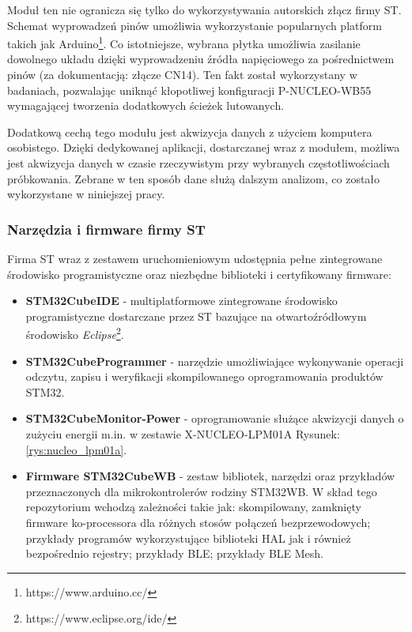 Moduł ten nie ogranicza się tylko do wykorzystywania autorskich złącz firmy ST. Schemat wyprowadzeń pinów
umożliwia wykorzystanie popularnych platform takich jak Arduino\footnote{https://www.arduino.cc/}. Co istotniejsze, wybrana płytka umożliwia
zasilanie dowolnego układu dzięki wyprowadzeniu źródła napięciowego za pośrednictwem pinów 
(za dokumentacją: złącze CN14). Ten fakt został wykorzystany w badaniach, pozwalając uniknąć kłopotliwej
konfiguracji P-NUCLEO-WB55 wymagającej tworzenia dodatkowych ścieżek lutowanych.

Dodatkową cechą tego modułu jest akwizycja danych z użyciem komputera osobistego. Dzięki dedykowanej
aplikacji, dostarczanej wraz z modułem, możliwa jest akwizycja danych w czasie rzeczywistym przy
wybranych częstotliwościach próbkowania. Zebrane w ten sposób dane służą dalszym analizom, co zostało
wykorzystane w niniejszej pracy. 

\subsubsection{Narzędzia i firmware firmy ST}
Firma ST wraz z zestawem uruchomieniowym udostępnia pełne zintegrowane środowisko
programistyczne oraz niezbędne biblioteki i certyfikowany firmware:

\begin{itemize}
\item \textbf{STM32CubeIDE} \cite{noauthor_stm32cubeide_2022} - multiplatformowe zintegrowane środowisko programistyczne
dostarczane przez ST bazujące na otwartoźródłowym środowisko \textit{Eclipse}\footnote{https://www.eclipse.org/ide/}.
\item \textbf{STM32CubeProgrammer} \cite{noauthor_stm32cubeprog_2022} - narzędzie umożliwiające wykonywanie operacji
odczytu, zapisu i weryfikacji skompilowanego oprogramowania produktów STM32. 
\item \textbf{STM32CubeMonitor-Power} \cite{noauthor_stm32cubemonpwr_2022} - oprogramowanie służące akwizycji danych
o zużyciu energii m.in. w zestawie X-NUCLEO-LPM01A Rysunek: \ref{rys:nucleo_lpm01a}.
\item \textbf{Firmware STM32CubeWB} \cite{noauthor_stm32cubewb_2022} - zestaw bibliotek, narzędzi oraz przykładów
przeznaczonych dla mikrokontrolerów rodziny STM32WB. W skład tego repozytorium wchodzą zależności takie jak:
skompilowany, zamknięty firmware ko-processora dla różnych stosów połączeń bezprzewodowych; przykłady programów
wykorzystujące biblioteki HAL jak i również bezpośrednio rejestry; przykłady BLE; przykłady BLE Mesh.
\end{itemize}

